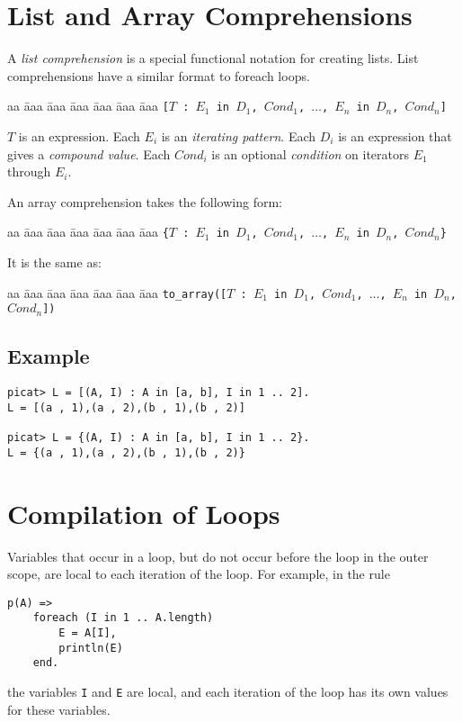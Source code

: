 \section{List and Array Comprehensions}
A \emph{list comprehension} is a special functional notation for creating lists.  List comprehensions have a similar format to foreach loops.
\begin{tabbing}
aa \= aaa \= aaa \= aaa \= aaa \= aaa \= aaa \kill
\> \> \texttt{[$T$ : $E_1$ \texttt{in} $D_1$, $Cond_1$, $\ldots$, $E_n$ in $D_n$, $Cond_n$]} 
\end{tabbing}
$T$ is an expression.  Each $E_i$ is an \emph{iterating pattern}.  Each $D_i$ is an expression that gives a \emph{compound value}.  Each $Cond_i$ is an optional \emph{condition} on iterators $E_1$ through $E_i$.

An array comprehension takes the following form:
\begin{tabbing}
aa \= aaa \= aaa \= aaa \= aaa \= aaa \= aaa \kill
\> \> \texttt{\{$T$ : $E_1$ \texttt{in} $D_1$, $Cond_1$, $\ldots$, $E_n$ in $D_n$, $Cond_n$\}} 
\end{tabbing}
It is the same as:
\begin{tabbing}
aa \= aaa \= aaa \= aaa \= aaa \= aaa \= aaa \kill
\> \> \texttt{to\_array([$T$ : $E_1$ \texttt{in} $D_1$, $Cond_1$, $\ldots$, $E_n$ in $D_n$, $Cond_n$])} 
\end{tabbing}

\subsection*{Example}
\begin{verbatim}
picat> L = [(A, I) : A in [a, b], I in 1 .. 2].
L = [(a , 1),(a , 2),(b , 1),(b , 2)]

picat> L = {(A, I) : A in [a, b], I in 1 .. 2}.
L = {(a , 1),(a , 2),(b , 1),(b , 2)}
\end{verbatim}

\section{Compilation of Loops}
Variables that occur in a loop, but do not occur before the loop in the outer scope, are local to each iteration of the loop. For example, in the rule
\begin{verbatim}
p(A) =>
    foreach (I in 1 .. A.length)
        E = A[I],
        println(E)
    end.
\end{verbatim}
the variables \texttt{I} and \texttt{E} are local, and each iteration of the loop has its own values for these variables.

